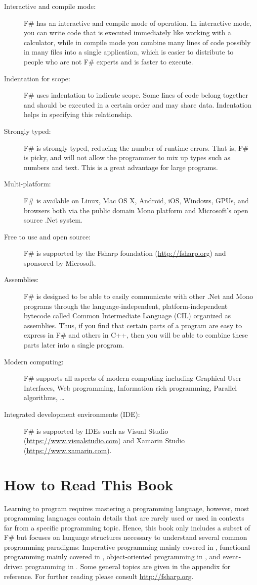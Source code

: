 \documentclass[fsharpNotes.tex]{subfiles}
\begin{document}
\begin{description}
\item[Interactive and compile mode:] F\# has an interactive and compile mode of operation. In interactive mode, you can write code that is executed immediately like working with a calculator, while in compile mode you combine many lines of code possibly in many files into a single application, which is easier to distribute to people who are not F\# experts and is faster to execute.
\item[Indentation for scope:] F\# uses indentation to indicate scope. Some lines of code belong together and should be executed in a certain order and may share data. Indentation helps in specifying this relationship.
\item[Strongly typed:] F\# is strongly typed, reducing the number of runtime errors. That is, F\# is picky, and will not allow the programmer to mix up types such as numbers and text. This is a great advantage for large programs.
\item[Multi-platform:] F\# is available on Linux, Mac OS X, Android, iOS, Windows, GPUs, and browsers both via the public domain Mono platform and Microsoft's open source .Net system.
\item[Free to use and open source:] F\# is supported by the Fsharp foundation (\url{http://fsharp.org}) and sponsored by Microsoft.
\item[Assemblies:] F\# is designed to be able to easily communicate with other .Net and Mono programs through the language-independent, platform-independent bytecode called Common Intermediate Language (CIL) organized as assemblies. Thus, if you find that certain parts of a program are easy to express in F\# and others in C++, then you will be able to combine these parts later into a single program.
\item[Modern computing:] F\# supports all aspects of modern computing including Graphical User Interfaces, Web programming, Information rich programming, Parallel algorithms, \dots
\item[Integrated development environments (IDE):] F\# is supported by IDEs such as Visual Studio (\url{https://www.visualstudio.com}) and Xamarin Studio (\url{https://www.xamarin.com}).
\end{description}

\section{How to Read This Book}
Learning to program requires mastering a programming language, however, most programming languages contain details that are rarely used or used in contexts far from a specific programming topic. Hence, this book only includes a subset of F\# but focuses on language structures necessary to understand several common programming paradigms: Imperative programming mainly covered in , functional programming mainly covered in , object-oriented programming in , and event-driven programming in .  Some general topics are given in the appendix for reference. For further reading please consult \url{http://fsharp.org}.
\end{document}
